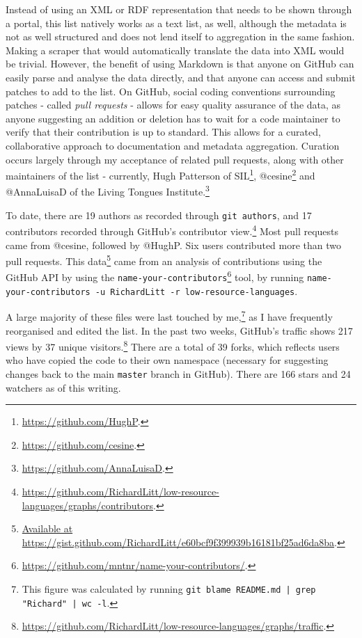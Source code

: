 Instead of using an XML or RDF representation that needs to be shown through a portal, this list natively works as a text list, as well, although the metadata is not as well structured and does not lend itself to aggregation in the same fashion. Making a scraper that would automatically translate the data into XML would be trivial. However, the benefit of using Markdown is that anyone on GitHub can easily parse and analyse the data directly, and that anyone can access and submit patches to add to the list. On GitHub, social coding conventions surrounding patches - called {\it pull requests} - allows for easy quality assurance of the data, as anyone suggesting an addition or deletion has to wait for a code maintainer to verify that their contribution is up to standard. This allows for a curated, collaborative approach to documentation and metadata aggregation. Curation occurs largely through my acceptance of related pull requests, along with other maintainers of the list - currently, Hugh Patterson of SIL\footnote{\href{https://github.com/HughP}{https://github.com/HughP}. }, @cesine\footnote{\href{https://github.com/cesine}{https://github.com/cesine}. } and @AnnaLuisaD of the Living Tongues Institute.\footnote{\href{https://github.com/AnnaLuisaD}{https://github.com/AnnaLuisaD}. }

To date, there are 19 authors as recorded through {\tt git authors}, and 17 contributors recorded through GitHub's contributor view.\footnote{\href{https://github.com/RichardLitt/low-resource-languages/graphs/contributors}{https://github.com/RichardLitt/low-resource-languages/graphs/contributors}. } Most pull requests came from @cesine, followed by @HughP. Six users contributed more than two pull requests. This data\footnote{\href{https://gist.github.com/RichardLitt/e60bcf9f399939b16181bf25ad6da8ba}{Available at https://gist.github.com/RichardLitt/e60bcf9f399939b16181bf25ad6da8ba}. } came from an analysis of contributions using the GitHub API by using the {\tt name-your-contributors}\footnote{\href{https://github.com/mntnr/name-your-contributors/}{https://github.com/mntnr/name-your-contributors/}. } tool, by running {\tt name-your-contributors -u RichardLitt -r low-resource-languages}.

A large majority of these files were last touched by me,\footnote{This figure was calculated by running {\tt git blame README.md | grep "Richard" | wc -l}.} as I have frequently reorganised and edited the list. In the past two weeks, GitHub's traffic shows 217 views by 37 unique visitors.\footnote{\href{https://github.com/RichardLitt/low-resource-languages/graphs/traffic}{https://github.com/RichardLitt/low-resource-languages/graphs/traffic}. } There are a total of 39 forks, which reflects users who have copied the code to their own namespace (necessary for suggesting changes back to the main {\tt master} branch in GitHub). There are 166 stars and 24 watchers as of this writing.

